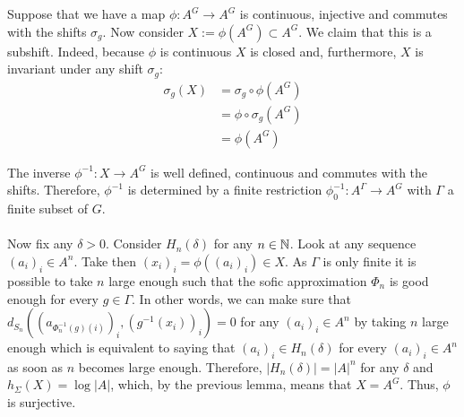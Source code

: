 Suppose that we have a map $\phi: A^G \to A^G$ is continuous, injective and commutes with the shifts $\sigma_g$. Now consider $X := \phi(A^G) \subset A^G$. We claim that this is a subshift. Indeed, because $\phi$ is continuous $X$ is closed and, furthermore, $X$ is invariant under any shift $\sigma_g$: 
		\begin{align*}
		\sigma_g(X)
		&= \sigma_g \circ \phi(A^G) \\
		&= \phi \circ \sigma_g(A^G) \\
		&= \phi(A^G)
		\end{align*}
		
The inverse $\phi^{-1}: X \to A^G$ is well defined, continuous and commutes with the shifts. Therefore,  $\phi^{-1}$ is determined by a finite restriction $\phi^{-1}_0: A^{\Gamma} \to A^G$ with $\Gamma$ a finite subset of $G$. \\
\\
Now fix any $\delta > 0$. Consider $H_n(\delta)$ for any $n \in \mathbb{N}$. Look at any sequence $(a_i)_i \in A^n$. Take then $(x_i)_i = \phi((a_i)_i) \in X$. As $\Gamma$ is only finite it is possible to take $n$ large enough such that the sofic approximation $\Phi_n$ is good enough for every $g \in \Gamma$. In other words, we can make sure that $d_{S_n}((a_{\Phi^{-1}_n(g)(i)})_i,(g^{-1}(x_i))_i) = 0$ for any  $(a_i)_i \in A^n$ by taking $n$ large enough which is equivalent to saying that $(a_i)_i \in H_n(\delta)$ for every $(a_i)_i \in A^n$ as soon as $n$ becomes large enough. Therefore, $|H_n(\delta)| = |A|^{n}$ for any $\delta$ and $h_\Sigma(X) = \log |A|$, which, by the previous lemma, means that $X = A^G$. Thus, $\phi$ is surjective.